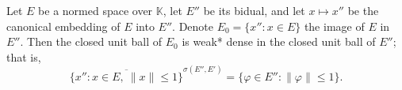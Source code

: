 Let $E$ be a normed space over $\mathbb{K}$, let $E''$ be its bidual, and let $x \mapsto x''$ be the canonical embedding of $E$ into $E''$. Denote $E_0 = \{x'' : x \in E\}$ the image of $E$ in $E''$. Then the closed unit ball of $E_0$ is weak* dense in the closed unit ball of $E''$; that is,
$$
\overline{\{x'' : x \in E,\ \|x\| \leq 1\}}^{\sigma(E'', E')} = \{\varphi \in E'' : \|\varphi\| \leq 1\}.
$$
